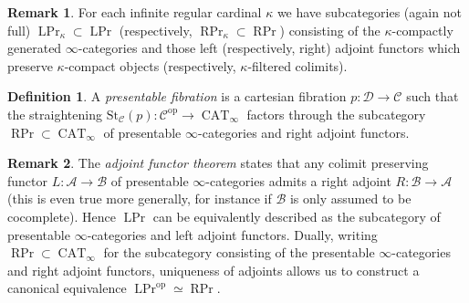 \documentclass[12pt]{article}
\theoremstyle{definition}
\newtheorem{definition}{Definition}[subsection]
\newtheorem{remark}{Remark}[subsection]
\newcommand{\A}{\mathcal{A}}
\newcommand{\B}{\mathcal{B}}
\newcommand{\C}{\mathcal{C}}
\newcommand{\D}{\mathcal{D}}
\renewcommand{\i}{\infty}
\newcommand{\op}{\mathrm{op}}
\DeclareMathOperator{\CAT}{CAT}
\DeclareMathOperator{\PrL}{LPr}
\DeclareMathOperator{\PrR}{RPr}
\begin{document}
\begin{remark}
For each infinite regular cardinal $\kappa$ we have subcategories (again not full) $\PrL_\kappa\subset\PrL$
\index{$\PrL_\kappa$}
\index{$\PrR_\kappa$}
(respectively, $\PrR_\kappa\subset\PrR$) consisting of the $\kappa$-compactly generated $\infty$-categories and those left (respectively, right) adjoint functors which preserve $\kappa$-compact objects (respectively, $\kappa$-filtered colimits).
\end{remark}



\begin{definition}
A {\em presentable fibration}
is a cartesian fibration $p:\D\to\C$ such that the straightening $\mathrm{St}_\C(p):\C^{\op}\to\CAT_\i$ factors through the subcategory $\PrR\subset\CAT_\i$ of presentable $\i$-categories and right adjoint functors.
\end{definition}

\begin{remark}\label{rem:aft}
The {\em adjoint functor theorem}
\cite[Corollary 5.5.2.9]{HTT} states that any colimit preserving functor $L:\A\to\B$ of presentable $\i$-categories admits a right adjoint $R:\B\to\A$ (this is even true more generally, for instance if $\B$ is only assumed to be cocomplete).
Hence $\PrL$ can be equivalently described as the subcategory of presentable $\i$-categories and left adjoint functors.
Dually, writing $\PrR\subset\CAT_\i$ for the subcategory consisting of the presentable $\i$-categories and right adjoint functors, uniqueness of adjoints allows us to construct a canonical equivalence
$
\PrL^{\op}\simeq\PrR.
$
\end{remark}
\end{document}
